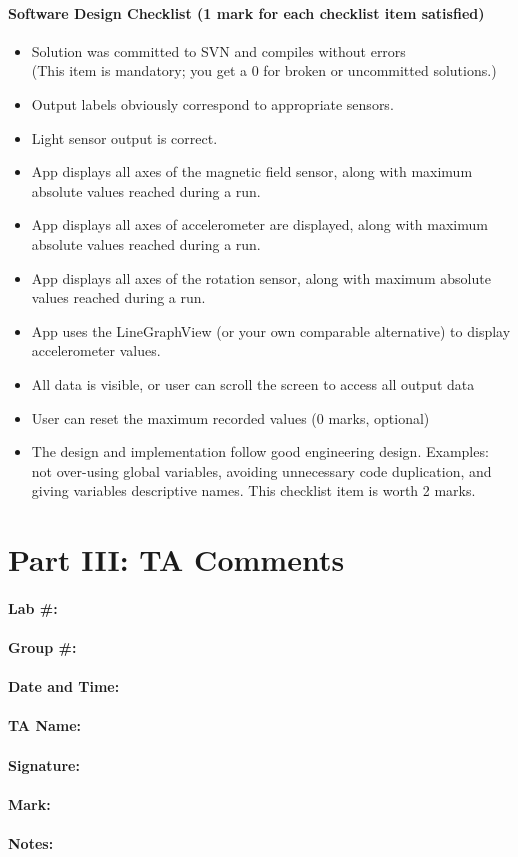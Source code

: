 \documentclass[10pt]{article}
\begin{document}
\paragraph{Software Design Checklist (1 mark for each checklist item satisfied)}
\begin{itemize}
\renewcommand{\labelitemi}{$\Box$}
\item Solution was committed to SVN and compiles without errors \\
(This item is mandatory; you get a 0 for broken or uncommitted solutions.)
\item Output labels obviously correspond to appropriate sensors.
\item Light sensor output is correct.
\item App displays all axes of the magnetic field sensor, along with maximum absolute values reached during a run.
\item App displays all axes of accelerometer are displayed, along with maximum absolute values reached during a run.
\item App displays all axes of the rotation sensor, along with maximum absolute values reached during a run.
\item App uses the LineGraphView (or your own comparable alternative) to display accelerometer values.
\item All data is visible, or user can scroll the screen to access all output data
\item User can reset the maximum recorded values (0 marks, optional)
\renewcommand{\labelitemi}{$\Box\Box$}
\item The design and implementation follow good engineering design. Examples: not over-using global variables, avoiding unnecessary code duplication, and giving variables descriptive names. This checklist item is worth 2 marks.
\end{itemize}

\newpage

\section*{Part III: TA Comments}

\paragraph{Lab \#:}
\paragraph{Group \#:}
\paragraph{Date and Time:}

\paragraph{TA Name:}
\paragraph{Signature:}

\paragraph{Mark:}

\paragraph{Notes:}
\end{document}
